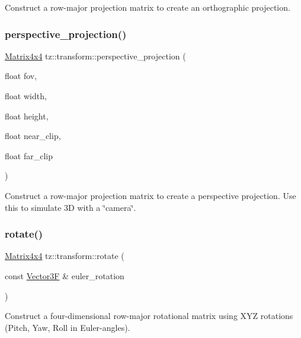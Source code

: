 Construct a row-\/major projection matrix to create an orthographic projection. \mbox{\label{namespacetz_1_1transform_aadc949f1b24a655a504e9a7ead18e2b2}} 
\subsubsection{\texorpdfstring{perspective\+\_\+projection()}{perspective\_projection()}}
{\footnotesize\ttfamily \mbox{\hyperlink{class_matrix4x4}{Matrix4x4}} tz\+::transform\+::perspective\+\_\+projection (\begin{DoxyParamCaption}\item[{float}]{fov,  }\item[{float}]{width,  }\item[{float}]{height,  }\item[{float}]{near\+\_\+clip,  }\item[{float}]{far\+\_\+clip }\end{DoxyParamCaption})}

Construct a row-\/major projection matrix to create a perspective projection. Use this to simulate 3D with a \char`\"{}camera\char`\"{}. \mbox{\label{namespacetz_1_1transform_aeeb88eb1d2cd9565afb0cca2ab011f89}} 
\subsubsection{\texorpdfstring{rotate()}{rotate()}}
{\footnotesize\ttfamily \mbox{\hyperlink{class_matrix4x4}{Matrix4x4}} tz\+::transform\+::rotate (\begin{DoxyParamCaption}\item[{const \mbox{\hyperlink{class_vector3}{Vector3F}} \&}]{euler\+\_\+rotation }\end{DoxyParamCaption})}

Construct a four-\/dimensional row-\/major rotational matrix using X\+YZ rotations (Pitch, Yaw, Roll in Euler-\/angles). \mbox{\label{namespacetz_1_1transform_a41841500a4f61978a446b7a92a982c61}} 
